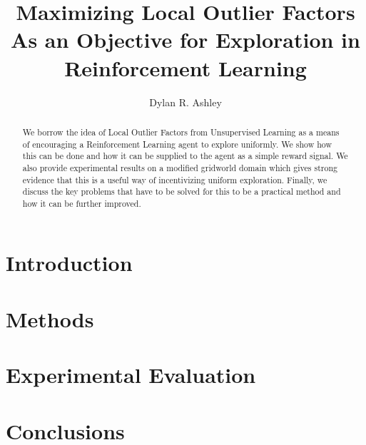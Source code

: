 \documentclass[12pt,english]{article}
\begin{document}
\title{Maximizing Local Outlier Factors As an Objective for Exploration in Reinforcement Learning}
\author{Dylan R. Ashley}
\date{}
\maketitle

\begin{abstract}
    \normalsize
    We borrow the idea of Local Outlier Factors from Unsupervised Learning as a means of encouraging a Reinforcement Learning agent to explore uniformly. We show how this can be done and how it can be supplied to the agent as a simple reward signal. We also provide experimental results on a modified gridworld domain which gives strong evidence that this is a useful way of incentivizing uniform exploration. Finally, we discuss the key problems that have to be solved for this to be a practical method and how it can be further improved.
\end{abstract}

\section{Introduction}
\label{sec:introduction}


\section{Methods}
\label{sec:methods}


\section{Experimental Evaluation}
\label{sec:experimental_evaluation}


\section{Conclusions}
\label{sec:conclusions}




\end{document}
